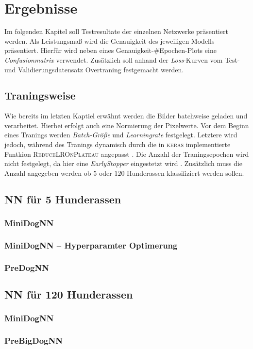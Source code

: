 \section{Ergebnisse}
Im folgenden Kapitel soll Testresultate der einzelnen Netzwerke präsentiert
werden. Als Leistungsmaß wird die Genauigkeit des jeweiligen Modells präsentiert.
Hierfür wird neben eines Genauigkeit-\#Epochen-Plots eine \emph{Confusionmatrix}
verwendet. Zusätzlich soll anhand der \emph{Loss}-Kurven vom Test- und Validierungsdatensatz
Overtraning festgemacht werden.

\subsection{Traningsweise}
Wie bereits im letzten Kaptiel erwähnt werden die
Bilder batchweise geladen und verarbeitet. Hierbei erfolgt auch eine Normierung
der Pixelwerte. Vor dem Beginn eines Tranings werden \emph{Batch-Größe} und
\emph{Learningrate} festgelegt. Letztere wird jedoch, während des Tranings dynamisch
durch die in \textsc{keras} implementierte Funtkion \textsc{ReduceLROnPlateau}
angepasst \cite{keras_ReduceLROnPlateau}. Die Anzahl der Traningsepochen
wird nicht festgelegt, da hier eine \emph{EarlyStopper} eingestetzt wird \cite{keras_EarlyStopping}.
Zusätzlich muss die Anzahl angegeben werden ob $5$ oder $120$ Hunderassen
klassifiziert werden sollen.

\subsection{NN für 5 Hunderassen}

\subsubsection{MiniDogNN}

\subsubsection{MiniDogNN -- Hyperparamter Optimerung}

\subsubsection{PreDogNN}


\subsection{NN für 120 Hunderassen}

\subsubsection{MiniDogNN}

\subsubsection{PreBigDogNN}
